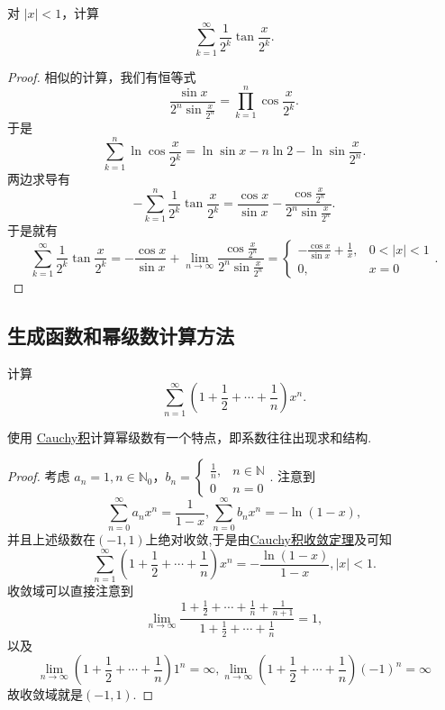 \documentclass[../../main.tex]{subfiles}
\begin{document}
\begin{example}
对 \(|x| < 1\)，计算
\[
\sum_{k=1}^{\infty} \frac{1}{2^k} \tan \frac{x}{2^k}.
\]
\end{example}
\begin{proof}
相似的计算，我们有恒等式
\[
\frac{\sin x}{2^n \sin \frac{x}{2^n}} = \prod_{k=1}^{n} \cos \frac{x}{2^k}.
\]
于是
\[
\sum_{k=1}^{n} \ln \cos \frac{x}{2^k}=\ln \sin x - n \ln 2 - \ln \sin \frac{x}{2^n}.
\]
两边求导有
\[
- \sum_{k=1}^{n} \frac{1}{2^k} \tan \frac{x}{2^k} = \frac{\cos x}{\sin x} - \frac{\cos \frac{x}{2^n}}{2^n \sin \frac{x}{2^n}}.
\]
于是就有
\[
\sum_{k=1}^{\infty} \frac{1}{2^k} \tan \frac{x}{2^k} = - \frac{\cos x}{\sin x} + \lim_{n \to \infty} \frac{\cos \frac{x}{2^n}}{2^n \sin \frac{x}{2^n}} = 
\begin{cases} 
- \frac{\cos x}{\sin x} + \frac{1}{x}, & 0 < |x| < 1 \\
0, & x = 0 
\end{cases}.
\]
\end{proof}



\subsection{生成函数和幂级数计算方法}

\begin{example}\label{example:例题11.24556415}
计算
\[
\sum_{n=1}^{\infty} \left(1 + \frac{1}{2} + \cdots + \frac{1}{n}\right) x^n.
\]
\end{example}
\begin{note}
使用 \hyperref[definition:Cauchy积]{Cauchy积}计算幂级数有一个特点，即系数往往出现求和结构.
\end{note}
\begin{proof}
考虑 \(a_n = 1, n \in \mathbb{N}_0\)，\(b_n = \begin{cases} \frac{1}{n}, & n \in \mathbb{N} \\ 0 & n = 0 \end{cases}\). 注意到
\[
\sum_{n=0}^{\infty} a_n x^n = \frac{1}{1 - x}, \sum_{n=0}^{\infty} b_n x^n = -\ln (1 - x),
\]
并且上述级数在$(-1,1)$上绝对收敛,于是由\hyperref[theorem:Cauchy积收敛定理]{Cauchy积收敛定理}及可知
\[
\sum_{n=1}^{\infty} \left(1 + \frac{1}{2} + \cdots + \frac{1}{n}\right) x^n = -\frac{\ln (1 - x)}{1 - x}, |x| < 1.
\]
收敛域可以直接注意到
\[
\lim_{n \to \infty} \frac{1 + \frac{1}{2} + \cdots + \frac{1}{n} + \frac{1}{n + 1}}{1 + \frac{1}{2} + \cdots + \frac{1}{n}} = 1,
\]
以及
\[
\lim_{n \to \infty} \left(1 + \frac{1}{2} + \cdots + \frac{1}{n}\right) 1^n = \infty, \lim_{n \to \infty} \left(1 + \frac{1}{2} + \cdots + \frac{1}{n}\right) (-1)^n = \infty
\]
故收敛域就是$(-1,1)$.
\end{proof}
\end{document}
